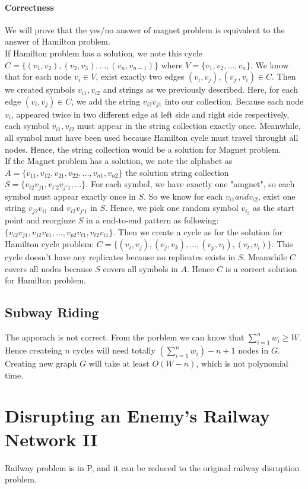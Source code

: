 \documentclass{article}
\begin{document}
	\paragraph{Correctness}
	We will prove that the yes/no answer of magnet problem is equivalent to the answer of Hamilton problem.\\
	If Hamilton problem has a solution, we note this cycle $C=\{(v_1,v_2),(v_2, v_3),...,(v_n,v_{n-1})\}$ where $V=\{v_1, v_2,...,v_n\}$. We know that for each node $v_i\in V$, exist exactly two edges $(v_i,v_j),(v_{j'},v_i)\in C$. Then we created symbols $v_{i1},v_{i2}$ and strings as we previously described. Here, for each edge $(v_i,v_j)\in C$, we add the string $v_{i2} v_{j1}$ into our collection. Because each node $v_i$, appeared twice in two different edge at left side and right side respectively, each symbol $v_{i1},v_{i2}$ must appear in the string collection exactly once. Meanwhile, all symbol must have been used because Hamilton cycle must travel throught all nodes. Hence, the string collection would be a solution for Magnet problem. \\
	If the Magnet problem has a solution, we note the alphabet as $A=\{v_{11}, v_{12}, v_{21}, v_{22},...,v_{n1},v_{n2}\}$ the solution string collection $S=\{v_{i2}v_{j1}, v_{i'2}v_{j'1},...\}$. For each symbol, we have exactly one "amgnet", so each symbol must appear exactly once in $S$. So we know for each $v_{i1} and v_{i2}$, exist one string $v_{j2}v_{i1}$ and $v_{i2}v_{j'1}$ in $S$. Hence, we pick one random symbol $v_{i_2}$ as the start point and reorginze $S$ in a end-to-end pattern as following: $\{v_{i2}v_{j1}, v_{j2}v_{k1},...,v_{p2}v_{t1},v_{t2}v_{i1}\}$. Then we create a cycle as for the solution for Hamilton cycle problem: $C=\{(v_i, v_j),(v_j,v_k),...,(v_p, v_t),(v_t,v_i)\}$. This cycle doesn't have any replicates because no replicates exists in $S$. Meanwhile $C$ covers all nodes because $S$ covers all symbols in $A$. Hence $C$ is a correct solution for Hamilton problem. 
	
	\subsection{Subway Riding}
	The apporach is not correct. From the porblem we can know that $\sum_{i=1}^n {w_i}\geq W$. Hence createing $n$ cycles will need totally $(\sum_{i=1}^n {w_i}) -n+1$ nodes in $G$. Creating new graph $G$ will take at least $O(W-n)$, which is not polynomial time.
	
	\section{Disrupting an Enemy's Railway Network II}
	Railway problem is in P, and it can be reduced to the original railway disruption problem. 
\end{document}
